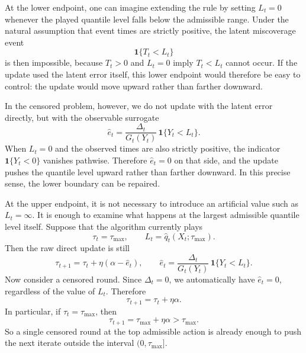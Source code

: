 \documentclass[11pt]{article}
\newcommand{\1}{\mathbf{1}}
\begin{document}
At the lower endpoint, one can imagine extending the rule by setting $L_t=0$ whenever the played quantile level falls below the admissible range. Under the natural assumption that event times are strictly positive, the latent miscoverage event
\[
\1\{T_t< L_t\}
\]
is then impossible, because $T_t>0$ and $L_t=0$ imply $T_t<L_t$ cannot occur. If the update used the latent error itself, this lower endpoint would therefore be easy to control: the update would move upward rather than farther downward.

In the censored problem, however, we do not update with the latent error directly, but with the observable surrogate
\[
\hat e_t
=
\frac{\Delta_t}{G_t(Y_t)}\,\mathbf{1}\{Y_t< L_t\}.
\]
When $L_t=0$ and the observed times are also strictly positive, the indicator $\mathbf{1}\{Y_t<0\}$ vanishes pathwise. Therefore $\hat e_t=0$ on that side, and the update pushes the quantile level upward rather than farther downward. In this precise sense, the lower boundary can be repaired.

At the upper endpoint, it is not necessary to introduce an artificial value such as $L_t=\infty$. It is enough to examine what happens at the largest admissible quantile level itself. Suppose that the algorithm currently plays
\[
\tau_t=\tau_{\max},
\qquad
L_t=\hat q_t(X_t;\tau_{\max}).
\]
Then the raw direct update is still
\[
\tau_{t+1}=\tau_t+\eta(\alpha-\hat e_t),
\qquad
\hat e_t
=
\frac{\Delta_t}{G_t(Y_t)}\,\mathbf{1}\{Y_t< L_t\}.
\]
Now consider a censored round. Since $\Delta_t=0$, we automatically have $\hat e_t=0$, regardless of the value of $L_t$. Therefore
\[
\tau_{t+1}=\tau_t+\eta\alpha.
\]
In particular, if $\tau_t=\tau_{\max}$, then
\[
\tau_{t+1}=\tau_{\max}+\eta\alpha>\tau_{\max}.
\]
So a single censored round at the top admissible action is already enough to push the next iterate outside the interval $(0,\tau_{\max}]$.
\end{document}
